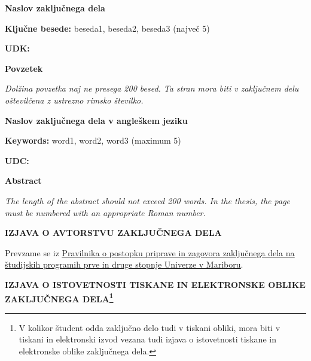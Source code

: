 \documentclass[slovene,openany,a4paper,12pt]{book}
\begin{document}
\newpage
\textbf{\Large Naslov zaključnega dela} %
\vspace*{2.0cm}

\textbf{Ključne besede:} beseda1, beseda2, beseda3 (največ 5) %
\vspace*{2.0cm}

\textbf{UDK:} %
\vspace*{2.0cm}

\textbf{Povzetek} %

\textit{Dolžina povzetka naj ne presega 200 besed. Ta stran mora biti v zaključnem delu oštevilčena z ustrezno rimsko številko.}

\newpage
\textbf{\Large{Naslov zaključnega dela v angleškem jeziku}} %
\vspace*{2.0cm}

\textbf{Keywords:} word1, word2, word3 (maximum 5) %
\vspace*{2.0cm}

\textbf{UDC:} %
\vspace*{2.0cm}

\textbf{Abstract} %

\textit{The length of the abstract should not exceed 200 words. In the thesis, the page must be numbered with an appropriate Roman number.}


\newpage
\begin{center}
    \textbf{IZJAVA O AVTORSTVU ZAKLJUČNEGA DELA}
\end{center}

Prevzame se iz \href{https://www.um.si/univerza/dokumentni-center/akti/GlavniDokumenti2013/Pravilnik\%20o\%20zaklj.\%20delih\%20na\%20\%C5\%A0P\%201.\%20in\%202.\%20st.\%20UM\%20(UPB\%201).pdf}{\ul{Pravilnika o postopku priprave in zagovora zaključnega dela na študijskih programih prve in druge stopnje Univerze v Mariboru}}.

\newpage
\begin{center}
    \textbf{IZJAVA O ISTOVETNOSTI TISKANE IN ELEKTRONSKE OBLIKE ZAKLJUČNEGA DELA\footnote{V kolikor študent odda zaključno delo tudi v tiskani obliki, mora biti v tiskani in elektronski izvod vezana tudi izjava o istovetnosti tiskane in elektronske oblike zaključnega dela.}}
\end{center}
\end{document}
